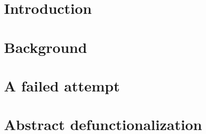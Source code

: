 \documentclass[a4paper,12pt]{report}
\theoremstyle{definition}
\begin{document}
\pagestyle{empty}
\singlespacing

\onehalfspacing

\singlespacing


\setcounter{page}{0}
\pagestyle{plain}
\tableofcontents
\listoffigures
\listoftables

\onehalfspacing


\chapter{Introduction}
\setcounter{page}{1} 


\setcounter{chapter}{1}
\chapter{Background}


\setcounter{chapter}{2}
\chapter{A failed attempt}


\setcounter{chapter}{3}
\chapter{Abstract defunctionalization}



\singlespacing
{}
 
 
\end{document}
